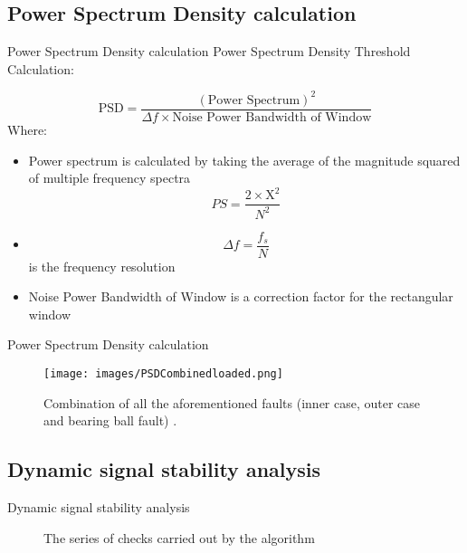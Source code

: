 \documentclass{beamer}
\begin{document}
	\subsection{Power Spectrum Density calculation}
	\begin{frame}{Power Spectrum Density calculation}
	Power Spectrum Density Threshold Calculation:
	
	\[
	\text{PSD} = \frac{(\text{Power Spectrum})^2}{\Delta f \times \text{Noise Power Bandwidth of Window}}
	\]
	Where: 
	\begin{itemize}
		\item Power spectrum is calculated by taking the average of the magnitude squared of multiple frequency spectra \[ PS = \frac{2 \times \text{X}^2}{N^2} \]
		\item \[ \Delta f  = \frac{f_{s}}{N} \] is the frequency resolution 
		\item Noise Power Bandwidth of Window is a correction factor for the rectangular window
	\end{itemize}
	\end{frame}
	
	\begin{frame}{Power Spectrum Density calculation}
	\begin{figure}[h]
		\centering
		\texttt{[image: images/PSDCombinedloaded.png]}
		\caption{Combination of all the aforementioned faults (inner case, outer case and bearing ball fault) \cite{Azeem2019}.}
		\label{fig:PSDCombinedloaded}
	\end{figure}
	\end{frame}
	
	\subsection{Dynamic signal stability analysis}
	\begin{frame}{Dynamic signal stability analysis}
	\begin{figure}[h]
		\centering
		\caption{The series of checks carried out by the algorithm}
		\label{fig:stabilityprocessflowdiagram}
	\end{figure}
	\end{frame}
	
\end{document}
